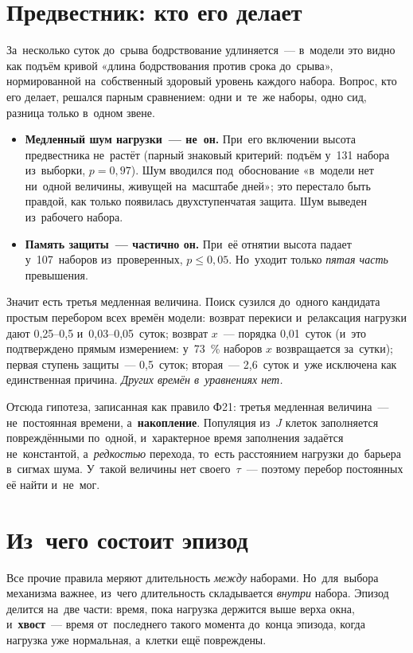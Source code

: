 \documentclass[11pt,a4paper,landscape,twocolumn]{article}
\begin{document}
\section{Предвестник: кто его делает}\label{sec:prodrome}
За~несколько суток до~срыва бодрствование удлиняется~— в~модели это видно как подъём кривой «длина бодрствования против срока до~срыва», нормированной на~собственный здоровый уровень каждого набора. Вопрос, кто его делает, решался парным сравнением: одни и~те~же наборы, одно сид, разница только в~одном звене.

\begin{itemize}
\item \textbf{Медленный шум нагрузки~— не~он.} При~его включении высота предвестника не~растёт (парный знаковый критерий: подъём у~131 набора из~выборки, $p=0{,}97$). Шум вводился под~обоснование «в~модели нет ни~одной величины, живущей на~масштабе дней»; это перестало быть правдой, как только появилась двухступенчатая защита. Шум выведен из~рабочего набора.
\item \textbf{Память защиты~— частично он.} При~её отнятии высота падает у~107~наборов из~проверенных, $p\le0{,}05$. Но~уходит только \emph{пятая часть} превышения.
\end{itemize}

Значит есть третья медленная величина. Поиск сузился до~одного кандидата простым перебором всех времён модели: возврат перекиси и~релаксация нагрузки дают 0,25–0,5 и~0,03–0,05~суток; возврат $x$~— порядка 0,01~суток (и~это подтверждено прямым измерением: у~73~\% наборов $x$ возвращается за~сутки); первая ступень защиты~— 0,5~суток; вторая~— 2,6~суток и~уже исключена как единственная причина. \emph{Других времён в~уравнениях нет.}

Отсюда гипотеза, записанная как правило Ф21: третья медленная величина~— не~постоянная времени, а~\textbf{накопление}. Популяция из~$J$ клеток заполняется повреждёнными по~одной, и~характерное время заполнения задаётся не~константой, а~\emph{редкостью} перехода, то~есть расстоянием нагрузки до~барьера в~сигмах шума. У~такой величины нет своего~$\tau$~— поэтому перебор постоянных её найти и~не~мог.

\section{Из~чего состоит эпизод}\label{sec:tail}
Все прочие правила меряют длительность \emph{между} наборами. Но~для~выбора механизма важнее, из~чего длительность складывается \emph{внутри} набора. Эпизод делится на~две части: время, пока нагрузка держится выше верха окна, и~\textbf{хвост}~— время от~последнего такого момента до~конца эпизода, когда нагрузка уже нормальная, а~клетки ещё повреждены.
\end{document}
